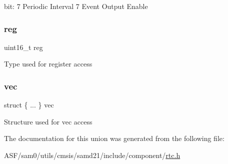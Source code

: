 bit\+: 7 Periodic Interval 7 Event Output Enable \mbox{\label{union_r_t_c___m_o_d_e0___e_v_c_t_r_l___type_a11760f5020019f4aa8cb02e694f7cc44}} 
\subsubsection{\texorpdfstring{reg}{reg}}
{\footnotesize\ttfamily uint16\+\_\+t reg}

Type used for register access \mbox{\label{union_r_t_c___m_o_d_e0___e_v_c_t_r_l___type_a9aa64c6b72b9ed24749017ea488fc991}} 
\subsubsection{\texorpdfstring{vec}{vec}}
{\footnotesize\ttfamily struct \{ ... \}   vec}

Structure used for vec access 

The documentation for this union was generated from the following file\+:\begin{DoxyCompactItemize}
\item 
A\+S\+F/sam0/utils/cmsis/samd21/include/component/\mbox{\hyperlink{component_2rtc_8h}{rtc.\+h}}\end{DoxyCompactItemize}
